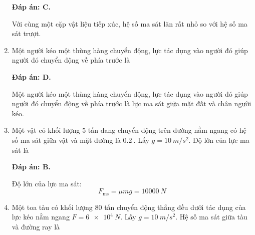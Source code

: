 \begin{enumerate}[label=\bfseries Câu \arabic*:,leftmargin=1.5cm]
	\hideall
	{	\textbf{Đáp án: C.}
		
		Với cùng một cặp vật liệu tiếp xúc, hệ số ma sát lăn rất nhỏ so với hệ số ma sát trượt.
	}
	\item {}
	
	
	{Một người kéo một thùng hàng chuyển động, lực tác dụng vào người đó giúp người đó chuyển động về phía trước là
	}
	
	\hideall
	{	\textbf{Đáp án: D.}
		
		Một người kéo một thùng hàng chuyển động, lực tác dụng vào người đó giúp người đó chuyển động về phía trước là lực ma sát giữa mặt đất và chân người kéo.
	}
	\item {}
	
	
	{Một vật có khối lượng 5 tấn đang chuyển động trên đường nằm ngang có hệ số ma sát giữa vật và mặt đường là $\SI{0.2}{}$. Lấy $g=\SI{10}{m/s^2}$. Độ lớn của lực ma sát là
	}
	
	\hideall
	{	\textbf{Đáp án: B.}
		
		Độ lớn của lực ma sát:
		$$F_\text{ms} = \mu m g = \SI{10000}{N}$$
	}
	\item {}
	
	
	{Một toa tàu có khối lượng 80 tấn chuyển động thẳng đều dưới tác dụng của lực kéo nằm ngang $F=\SI{6e4}{N}$. Lấy $g=\SI{10}{m/s^2}$. Hệ số ma sát giữa tàu và đường ray là
	}
	

\end{enumerate}

